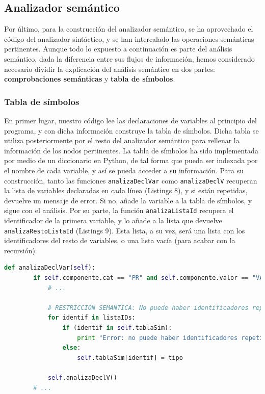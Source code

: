 \documentclass[11pt]{article}
\begin{document}
\subsection{Analizador semántico}
Por último, para la construcción del analizador semántico, se ha aprovechado el código del analizador sintáctico, y se han intercalado las operaciones semánticas pertinentes. Aunque todo lo expuesto a continuación es parte del análisis semántico, dada la diferencia entre sus flujos de información, hemos considerado necesario dividir la explicación del análisis semántico en dos partes: \textbf{comprobaciones semánticas} y \textbf{tabla de símbolos}.

\subsubsection{Tabla de símbolos}
En primer lugar, nuestro código lee las declaraciones de variables al principio del programa, y con dicha información construye la tabla de símbolos. Dicha tabla se utiliza posteriormente por el resto del analizador semántico para rellenar la información de los nodos pertinentes.
La tabla de símbolos ha sido implementada por medio de un diccionario en Python, de tal forma que pueda ser indexada por el nombre de cada variable, y así se pueda acceder a su información. Para su construcción, tanto las funciones \lstinline[language=Python]{analizaDeclVar} como \lstinline[language=Python]{analizaDeclV} recuperan la lista de variables declaradas en cada línea (Listings 8), y si están repetidas, devuelve un mensaje de error. Si no, añade la variable a la tabla de símbolos, y sigue con el análisis. Por su parte, la función \lstinline[language=Python]{analizaListaId} recupera el identificador de la primera variable, y lo añade a la lista que devuelve \lstinline[language=Python]{analizaRestoListaId} (Listings 9). Esta lista, a su vez, será una lista con los identificadores del resto de variables, o una lista vacía (para acabar con la recursión).

\begin{minipage}{\linewidth}
	\begin{lstlisting}[language=Python, caption=analizaDeclVar()]
	def analizaDeclVar(self):
        if self.componente.cat == "PR" and self.componente.valor == "VAR":
            # ...

            # RESTRICCION SEMANTICA: No puede haber identificadores repetidos
            for identif in listaIDs:
                if (identif in self.tablaSim):
                    print "Error: no puede haber identificadores repetidos. ID repetido: " + str(identif)
                else:
                    self.tablaSim[identif] = tipo

            self.analizaDeclV()
        # ...
	\end{lstlisting}
\end{minipage}
\end{document}
